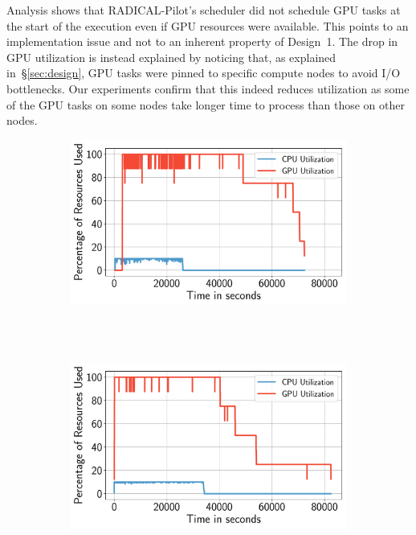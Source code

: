 Analysis shows that RADICAL-Pilot's scheduler did not schedule GPU tasks at the start of the execution even if GPU resources were available.
This points to an implementation issue and not to an inherent property of Design~1.
The drop in GPU utilization is instead explained by noticing that, as explained in~\S\ref{sec:design}, GPU tasks were pinned to specific compute nodes to avoid I/O bottlenecks.
Our experiments confirm that this indeed reduces utilization as some of the GPU tasks on some nodes take longer time to process than those on other nodes.

\begin{figure}[H]
    \centering
    \begin{subfigure}[b]{0.65\textwidth}
        \includegraphics[width=\textwidth]{figures/designs/Design1Utilization.pdf}
        \caption{}
        \label{fig:design1util}
    \end{subfigure}\\
    ~ 
    \begin{subfigure}[b]{0.65\textwidth}
        \includegraphics[width=\textwidth]{figures/designs/Design2Utilization.pdf}

\end{subfigure}
\end{figure}
